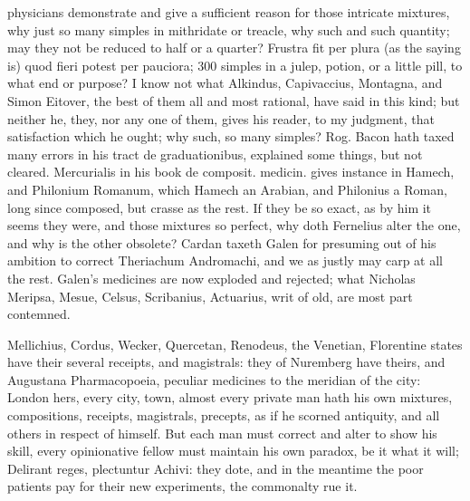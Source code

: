 {physicians demonstrate and give a sufficient reason for those intricate
mixtures, why just so many simples in mithridate or treacle, why such
and such quantity; may they not be reduced to half or a quarter?
Frustra fit per plura (as the saying is) quod fieri potest per
pauciora; 300 simples in a julep, potion, or a little pill, to what end
or purpose? I know not what Alkindus, Capivaccius, Montagna, and
Simon Eitover, the best of them all and most rational, have said in
this kind; but neither he, they, nor any one of them, gives his reader,
to my judgment, that satisfaction which he ought; why such, so many
simples? Rog. Bacon hath taxed many errors in his tract de
graduationibus, explained some things, but not cleared. Mercurialis in
his book de composit. medicin. gives instance in Hamech, and Philonium
Romanum, which Hamech an Arabian, and Philonius a Roman, long since
composed, but crasse as the rest. If they be so exact, as by him it
seems they were, and those mixtures so perfect, why doth Fernelius
alter the one, and why is the other obsolete? Cardan taxeth Galen
for presuming out of his ambition to correct Theriachum Andromachi, and
we as justly may carp at all the rest. Galen's medicines are now
exploded and rejected; what Nicholas Meripsa, Mesue, Celsus,
Scribanius, Actuarius, \etc{} writ of old, are most part contemned.

Mellichius, Cordus, Wecker, Quercetan, Renodeus, the Venetian,
Florentine states have their several receipts, and magistrals: they of
Nuremberg have theirs, and Augustana Pharmacopoeia, peculiar medicines
to the meridian of the city: London hers, every city, town, almost
every private man hath his own mixtures, compositions, receipts,
magistrals, precepts, as if he scorned antiquity, and all others in
respect of himself. But each man must correct and alter to show his
skill, every opinionative fellow must maintain his own paradox, be it
what it will; Delirant reges, plectuntur Achivi: they dote, and in the
meantime the poor patients pay for their new experiments, the
commonalty rue it.

}
